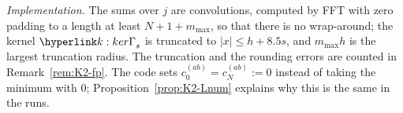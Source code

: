 \documentclass[11pt]{article}
\newcommand{\dt}[1]{\hypertarget{#1}{}}
\newcommand{\1}{\mathbf{1}}
\begin{document}
\begin{definition}\label{def:K2-inf}\dt{k:alg}
\leavevmode\par\smallskip\noindent{}
\end{definition}


\noindent\textit{Implementation.} The sums over $j$ are convolutions, computed by FFT with zero padding to a length at least $N+1+m_{\max}$, so that there is no
wrap-around; the kernel $\kGam_s$ is truncated to $|x|\le h+8.5s$, and $m_{\max}h$ is the largest truncation radius. The truncation and the rounding errors are
counted in Remark~\ref{rem:K2-fp}. The code sets $c^{(ab)}_0=c^{(ab)}_N:=0$ instead of taking the minimum with $0$; Proposition~\ref{prop:K2-Lnum} explains why this is
the same in the runs.
\end{document}
